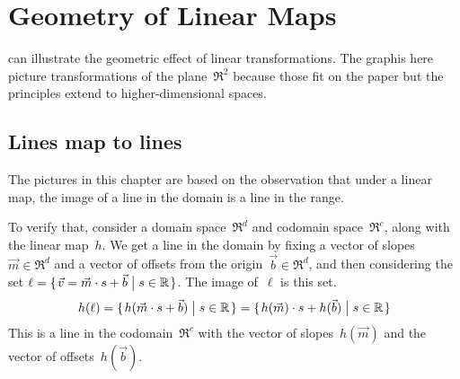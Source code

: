 \chapter{Geometry of Linear Maps}

\Sage{} can illustrate the geometric effect of linear transformations.
The graphis here picture transformations of the plane~$\Re^2$
because those fit on the paper but the principles extend to 
higher-dimensional spaces.




\section{Lines map to lines}
The pictures in this chapter are 
based on the observation that under a linear map, the image of a line
in the domain is a line in the range.

To verify that,
consider a domain space~$\Re^d$ and codomain space~$\Re^c$, along with
the linear map~$h$.
We get a line in the domain by fixing a vector of slopes~$\vec{m}\in\Re^d$
and a vector of offsets from the origin~$\vec{b}\in\Re^d$, 
and then considering the set 
$\ell = \mbox{$\{\hspace{0.1em}\vec{v}=\vec{m}\cdot s +\vec{b}\bigm| s\in\mathbb{R}\hspace{0.1em}\}$}$.
The image of~$\ell$ is this set. 
\begin{equation*}
  h(\ell)=\mbox{$\{\hspace{0.1em}h(\vec{m}\cdot s+\vec{b})\bigm| s\in\mathbb{R}\hspace{0.1em}\}$}
  =\mbox{$\{\hspace{0.1em}h(\vec{m})\cdot s+h(\vec{b})\bigm| s\in\mathbb{R}\hspace{0.1em}\}$}
\end{equation*}
This is a line in the codomain~$\Re^c$ with the vector of 
slopes~$h(\vec{m})$ and the vector of offsets~$h(\vec{b})$. 

